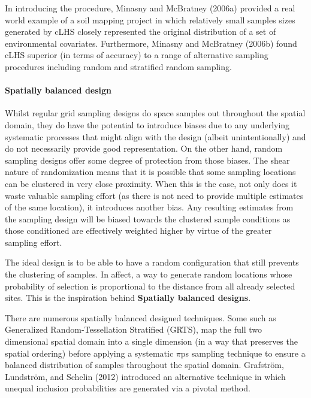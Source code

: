 \documentclass[a4paper]{article}
\begin{document}
In introducing the procedure, Minasny and McBratney (2006a) provided a
real world example of a soil mapping project in which relatively small
samples sizes generated by cLHS closely represented the original
distribution of a set of environmental covariates. Furthermore, Minasny
and McBratney (2006b) found cLHS superior (in terms of accuracy) to a
range of alternative sampling procedures including random and stratified
random sampling.

\hypertarget{spatially-balanced-design}{%
\paragraph{Spatially balanced design}\label{spatially-balanced-design}}

Whilst regular grid sampling designs do space samples out throughout the
spatial domain, they do have the potential to introduce biases due to
any underlying systematic processes that might align with the design
(albeit unintentionally) and do not necessarily provide good
representation. On the other hand, random sampling designs offer some
degree of protection from those biases. The shear nature of
randomization means that it is possible that some sampling locations can
be clustered in very close proximity. When this is the case, not only
does it waste valuable sampling effort (as there is not need to provide
multiple estimates of the same location), it introduces another bias.
Any resulting estimates from the sampling design will be biased towards
the clustered sample conditions as those conditioned are effectively
weighted higher by virtue of the greater sampling effort.

The ideal design is to be able to have a random configuration that still
prevents the clustering of samples. In affect, a way to generate random
locations whose probability of selection is proportional to the distance
from all already selected sites. This is the inspiration behind
\textbf{Spatially balanced designs}.

There are numerous spatially balanced designed techniques. Some such as
Generalized Random-Tessellation Stratified (GRTS), map the full two
dimensional spatial domain into a single dimension (in a way that
preserves the spatial ordering) before applying a systematic \(\pi\)ps
sampling technique to ensure a balanced distribution of samples
throughout the spatial domain. Grafström, Lundström, and Schelin (2012)
introduced an alternative technique in which unequal inclusion
probabilities are generated via a pivotal method.
\end{document}
